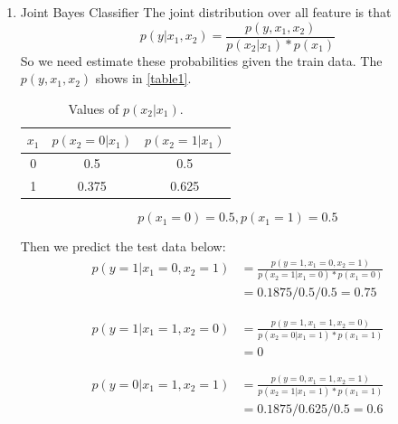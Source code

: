 \documentclass[12pt]{article}
\begin{document}
\begin{enumerate}
    \item Joint Bayes Classifier
    The joint distribution over all feature is that 
    \begin{equation}
    p(y|x_1, x_2) =  \frac{p(y,x_1,x_2)}{p(x_2|x_1) * p(x_1)}
    \end{equation}
    So we need estimate these probabilities given the train data. The $p(y, x_1, x_2)$ shows in \ref{table1}.

    \begin{table}[!hbp]
      \centering
      \begin{tabular}{|c||c|c|}
        \hline
        $x_1$ & $p(x_2=0 | x_1)$ & $p(x_2=1 | x_1)$ \\
        \hline
        0 & 0.5 & 0.5 \\
        \hline
        1 & 0.375 & 0.625 \\
        \hline
      \end{tabular}

      \caption{Values of $p(x_2 | x_1)$.}\label{table2}
    \end{table}

    \begin{equation}
    p(x_1 = 0) = 0.5 , p(x_1 = 1) = 0.5
    \end{equation}

    Then we predict the test data below:
    \begin{equation}
        \begin{split}
            p(y = 1|x_1 = 0, x_2 = 1) &= \frac{p(y = 1,x_1 = 0,x_2 = 1)}{p(x_2 = 1|x_1 = 0) * p(x_1 = 0)}\\
            &= 0.1875/0.5/0.5 = 0.75
        \end{split}
    \end{equation}

    \begin{equation}
        \begin{split}
            p(y = 1|x_1 = 1, x_2 = 0) &=  \frac{p(y = 1,x_1 = 1,x_2 = 0)}{p(x_2 = 0|x_1 = 1) * p(x_1 = 1)}\\
            &= 0
        \end{split}
    \end{equation}

    \begin{equation}
        \begin{split}
            p(y = 0|x_1 = 1, x_2 = 1) &=  \frac{p(y = 0,x_1 = 1,x_2 = 1)}{p(x_2 = 1|x_1 = 1) * p(x_1 = 1)}\\
            &= 0.1875/0.625/0.5 = 0.6
        \end{split}
    \end{equation}
    

\end{enumerate}
\end{document}
